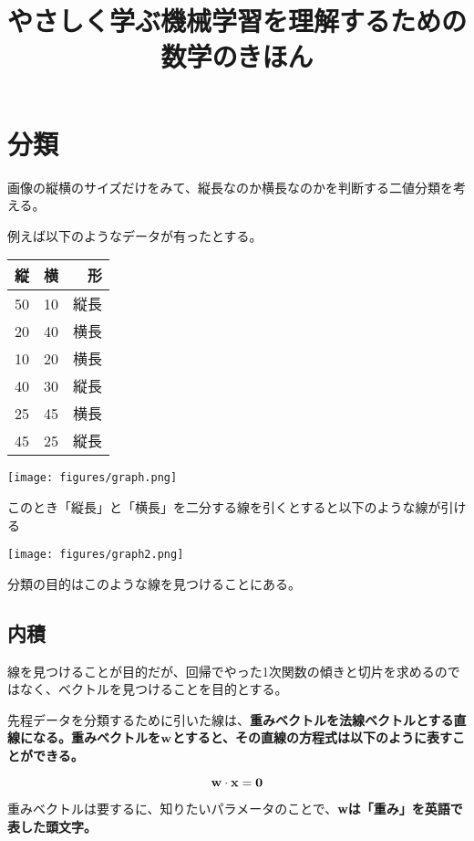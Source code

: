 \documentclass{jsarticle}
\title{やさしく学ぶ機械学習を理解するための数学のきほん}
\begin{document}
\maketitle

\section{分類}
画像の縦横のサイズだけをみて、縦長なのか横長なのかを判断する二値分類を考える。

例えば以下のようなデータが有ったとする。

\begin{table}[htb]
  \begin{tabular}{|l|c|r|} \hline
    縦 & 横 & 形 \\ \hline
    50 & 10 & 縦長 \\ \hline
	20 & 40 & 横長 \\ \hline
	10 & 20 & 横長 \\ \hline
	40 & 30 & 縦長 \\ \hline
	25 & 45 & 横長 \\  \hline
	45 & 25 & 縦長 \\ \hline
  \end{tabular}
\end{table}

\begin{center}
  \texttt{[image: figures/graph.png]}
\end{center}

このとき「縦長」と「横長」を二分する線を引くとすると以下のような線が引ける

\begin{center}
  \texttt{[image: figures/graph2.png]}
\end{center}

分類の目的はこのような線を見つけることにある。

\subsection{内積}
線を見つけることが目的だが、回帰でやった1次関数の傾きと切片を求めるのではなく、ベクトルを見つけることを目的とする。

先程データを分類するために引いた線は、\bf{重みベクトル}を\bf{法線ベクトル}とする直線になる。重みベクトルを$\bf{w}$とすると、その直線の方程式は以下のように表すことができる。

\[
	\bf{w} \cdot \bf{x} = 0
\]

重みベクトルは要するに、知りたいパラメータのことで、\bf{w}は「重み」を英語で表した頭文字。
\end{document}
